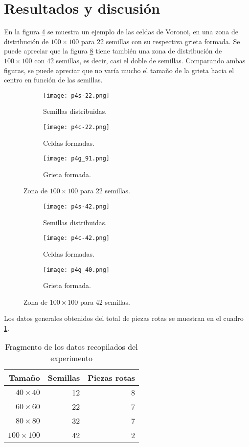 \documentclass[12pt]{amsart}
\begin{document}
\section{Resultados y discusión}
En la figura \ref{fig1} se muestra un ejemplo de las celdas de Voronoi, en una zona de distribución de $100\times100$ para 22 semillas con su respectiva grieta formada. Se puede apreciar que la figura \ref{fig2} tiene también una zona de distribución de $100\times100$ con 42 semillas, es decir, casi el doble de semillas. Comparando ambas figuras, se puede apreciar que no varía mucho el tamaño de la grieta hacia el centro en función de las semillas.
\newpage
\begin{figure}
\centering
\begin{subfigure}[b]{0.3\linewidth}
\texttt{[image: p4s-22.png]}
\caption{Semillas distribuidas.}
\label{o}
\end{subfigure}
\begin{subfigure}[b]{0.3\linewidth}
\texttt{[image: p4c-22.png]}
\caption{Celdas formadas.}
\label{s}
\end{subfigure}
\begin{subfigure}[b]{0.3\linewidth}
\texttt{[image: p4g\_91.png]}
\caption{Grieta formada.}
\label{se}
\end{subfigure}
\caption{Zona de $100\times100$ para 22 semillas.}
\label{fig1}
\end{figure}

\begin{figure}
\centering
\begin{subfigure}[b]{0.3\linewidth}
\texttt{[image: p4s-42.png]}
\caption{Semillas distribuidas.}
\label{o}
\end{subfigure}
\begin{subfigure}[b]{0.3\linewidth}
\texttt{[image: p4c-42.png]}
\caption{Celdas formadas.}
\label{s}
\end{subfigure}
\begin{subfigure}[b]{0.3\linewidth}
\texttt{[image: p4g\_40.png]}
\caption{Grieta formada.}
\label{se}
\end{subfigure}
\caption{Zona de $100\times100$ para 42 semillas.}
\label{fig2}
\end{figure}
Los datos generales obtenidos del total de piezas rotas se muestran en el cuadro \ref{datos1}.
\bigskip
\bigskip
\begin{table}[ht]
    \caption{Fragmento de los datos recopilados del experimento}
    \label{datos1}
    \centering
    \begin{tabular}{|r|r|r|}
       \hline
        Tamaño&Semillas&Piezas rotas\\
        \hline
        $40\times40$ & 12 & 8 \\
        $60\times60$ & 22 & 7 \\
        $80\times80$ & 32 & 7 \\
        $100\times100$ & 42 & 2 \\
        \hline
    \end{tabular}
\end{table}
\bigskip
\end{document}
